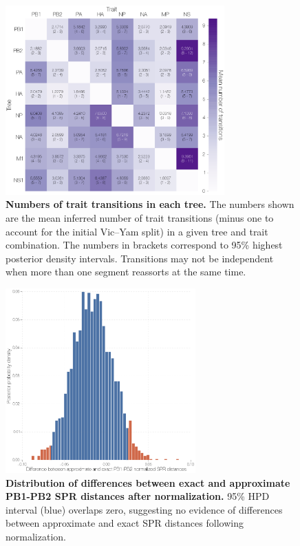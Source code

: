 \documentclass[11pt,oneside,letterpaper]{article}
\begin{document}
\begin{figure}
\centering  
\includegraphics[width=0.75\textwidth]  {supp_figures/InfB_Ntransitions.png}
\caption{\textbf{Numbers of trait transitions in each tree.}
The numbers shown are the mean inferred number of trait transitions (minus one to account for the initial Vic--Yam split) in a given tree and trait combination.
The numbers in brackets correspond to 95\% highest posterior density intervals.
Transitions may not be independent when more than one segment reassorts at the same time.}
\label{Ntransitions}
\end{figure}

\begin{figure}
\centering  
\includegraphics[width=0.65\textwidth]  {supp_figures/InfB_supp_NormPB1-PB2_hist.png}
\caption{\textbf{Distribution of differences between exact and approximate PB1-PB2 SPR distances after normalization.}
95\% HPD interval (blue) overlaps zero, suggesting no evidence of differences between approximate and exact SPR distances following normalization.}
\label{NormSPR_PB1-PB2_difference}
\end{figure}
\end{document}
